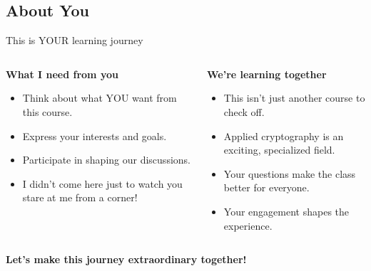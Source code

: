 \documentclass[aspectratio=169, lualatex, handout]{beamer}
\begin{document}
\subsection{About You}

\begin{frame}{This is YOUR learning journey}
	\begin{columns}[c]
		\begin{column}{0.5\textwidth}
			\textbf{What I need from you}
			\begin{itemize}[<+->]
				\item Think about what YOU want from this course.
				\item Express your interests and goals.
				\item Participate in shaping our discussions.
				\item I didn't come here just to watch you stare at me from a corner!
			\end{itemize}
		\end{column}
		\begin{column}{0.5\textwidth}
			\textbf{We're learning together}
			\begin{itemize}[<+->]
				\item This isn't just another course to check off.
				\item Applied cryptography is an exciting, specialized field.
				\item Your questions make the class better for everyone.
				\item Your engagement shapes the experience.
			\end{itemize}
		\end{column}
	\end{columns}
	\begin{center}
		\textcolor{cipherprimary}{\Large\textbf{Let's make this journey extraordinary together!}}
	\end{center}
\end{frame}
\end{document}
